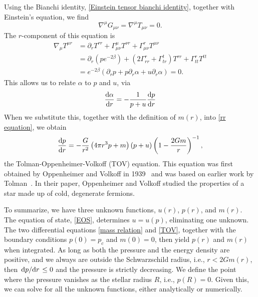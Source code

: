 Using the Bianchi identity, \autoref{Einstein tensor bianchi identity}, together with Einstein's equation, we find
%
\begin{equation}
    \nabla^\mu G_{\mu \nu} = \nabla^\mu T_{\mu \nu} = 0.
\end{equation}
%
The $r$-component of this equation is
%
\begin{align*}
    \nabla_\mu T^{\mu r} 
    & =
    \partial_r T^{rr} 
    + \Gamma^\mu_{\mu \nu} T^{\nu r} 
    + \Gamma^r_{\mu \nu} T^{\mu \nu}\\
    & = 
    \partial_r \left(p e^{-2\beta}\right)
    + (2 \Gamma^r_{rr} + \Gamma^t_{tr}) T^{rr} 
    + \Gamma^r_{tt}T^{tt} \\ 
    &=   e^{-2\beta} \left( \partial_r p + p \partial_r \alpha + u \partial_r \alpha \right) = 0.
\end{align*} 
%
This allows us to relate $\alpha$ to $p$ and $u$, via
%
\begin{equation}
    \label{alpha in terms of p and u}
    \odv{\alpha}{r}= - \frac{1}{p + u} \odv{p}{r}
\end{equation}
%
When we substitute this, together with the definition of $m(r)$, into \autoref{rr equation}, we obtain
%
\begin{equation}
    \label{TOV}
    \odv{p}{r}
    =
    -
    \frac{G}{r^2} 
    \left(4 \pi r^{3} p + m \right) 
    \left(p + u\right)
    \left(1 - \frac{2 G m}{r}\right)^{-1},
\end{equation}
%
the Tolman-Oppenheimer-Volkoff (TOV) equation.
This equation was first obtained by Oppenheimer and Volkoff in 1939~\autocite{oppenheimerMassiveNeutronCores1939} and was based on earlier work by Tolman~\autocite{tolmanRelativityThermodynamicsCosmology1934}.
In their paper, Oppenheimer and Volkoff studied the properties of a star made up of cold, degenerate fermions.

To summarize, we have three unknown functions, $u(r)$, $p(r)$, and $m(r)$.
The equation of state, \autoref{EOS}, determines $u = u(p)$, eliminating one unknown.
The two differential equations \autoref{mass relation} and \autoref{TOV}, together with the boundary conditions $p(0) = p_c$ and $m(0) = 0$, then yield $p(r)$ and $m(r)$ when integrated.
As long as both the pressure and the energy density are positive, and we always are outside the Schwarzschild radius, i.e., $r<2 G m(r)$, then $\odv{p}/{r} \leq 0$ and the pressure is strictly decreasing.
We define the point where the pressure vanishes as the stellar radius $R$, i.e., $p(R) = 0$.
Given this, we can solve for all the unknown functions, either analytically or numerically.


